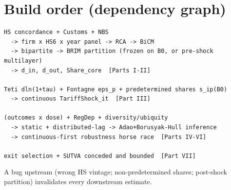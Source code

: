 \documentclass[11pt]{article}
\begin{document}
\section*{Build order (dependency graph)}
{\small
\begin{verbatim}
HS concordance + Customs + NBS
  -> firm x HS6 x year panel -> RCA -> BiCM
  -> bipartite -> BRIM partition (frozen on B0, or pre-shock multilayer)
  -> d_in, d_out, Share_core  [Parts I-II]

Teti dln(1+tau) + Fontagne eps_p + predetermined shares s_ip(B0)
  -> continuous TariffShock_it  [Part III]

(outcomes x dose) + RegDep + diversity/ubiquity
  -> static + distributed-lag -> Adao+Borusyak-Hull inference
  -> continuous-first robustness horse race  [Parts IV-VI]

exit selection + SUTVA conceded and bounded  [Part VII]
\end{verbatim}}
A bug upstream (wrong HS vintage; non-predetermined shares; post-shock partition)
invalidates every downstream estimate.



\end{document}
